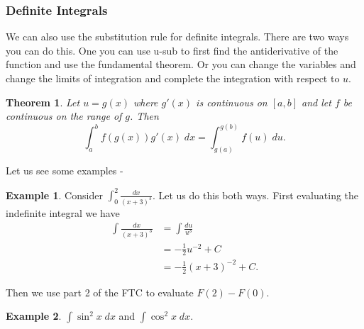 \documentclass[12pt,reqno]{article}
\newtheorem{Theorem}{Theorem}
\theoremstyle{definition}
\newtheorem*{Example}{Example}
\begin{document}
\subsubsection{Definite Integrals}
We can also use the substitution rule for definite integrals. There are two ways you can do this. One you can use u-sub to first find the antiderivative of the function and use the fundamental theorem. Or you can change the variables and change the limits of integration and complete the integration with respect to $u$. 

\begin{Theorem}
	Let $u = g(x)$ where $g'(x)$ is continuous on $[a, b]$ and let $f$ be continuous on the range of $g$. Then $$\int_{a}^{b} f(g(x))g'(x) \;dx = \int_{g(a)}^{g(b)} f(u) \; du.$$ 
\end{Theorem}

Let us see some examples - 
\begin{Example}
	Consider $\int_{0}^{2} \frac{dx}{(x + 3)^3}$. Let us do this both ways. First evaluating the indefinite integral we have \begin{align*}
		\int \frac{dx}{(x + 3)^3} &= \int \frac{du}{u^3} \\
								  &= -\frac{1}{2} u^{-2} + C \\
								  &= -\frac{1}{2} (x + 3)^{-2} + C. 
	\end{align*}

	Then we use part 2 of the FTC to evaluate $F(2) - F(0)$. 
\end{Example}

\begin{Example}
	$\int \sin^2 x \;dx$ and $\int \cos^2 x \; dx$. 
\end{Example}
\end{document}
